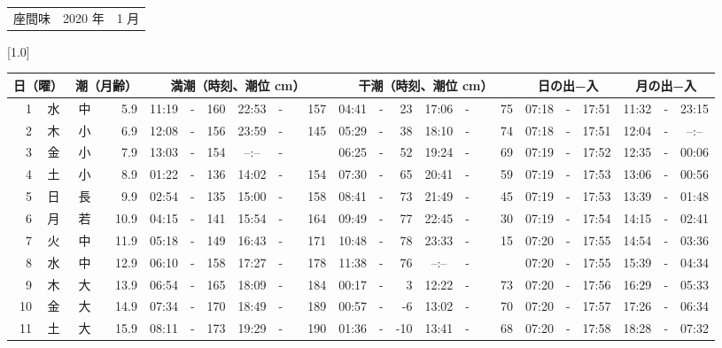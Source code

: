 \documentclass[12pt,a4j]{jsarticle}
\begin{document}
 \begin{table}[htbp]
 \begin{center}
 \begin{tabular}{lcc}
 \LARGE{座間味}  & \large{2020 年} & \large{ 1 月} \\
 \end{tabular}
 \end{center}
 \begin{center}
    \scalebox{0.7}[1.0]{
    \begin{tabular}{|rc|cr|ccrccr|ccrccr|ccc|ccc|}
    \hline
    \multicolumn{2}{|c|}{日（曜）} & \multicolumn{2}{c|}{潮（月齢）} & \multicolumn{6}{c|}{満潮（時刻、潮位 cm）} & \multicolumn{6}{c|}{干潮（時刻、潮位 cm）} & \multicolumn{3}{c|}{日の出−入} &  \multicolumn{3}{c|}{月の出−入}\\
 \hline
 1 & 水 & 中 &  5.9 &  11:19 &-& 160 &  22:53 &-& 157 &  04:41 &-&  23 &  17:06 &-&  75 & 07:18 & -& 17:51 & 11:32 & -& 23:15 \\
 2 & 木 & 小 &  6.9 &  12:08 &-& 156 &  23:59 &-& 145 &  05:29 &-&  38 &  18:10 &-&  74 & 07:18 & -& 17:51 & 12:04 & -& --:-- \\
 3 & 金 & 小 &  7.9 &  13:03 &-& 154 &  --:-- &-&~~~~~ &  06:25 &-&  52 &  19:24 &-&  69 & 07:19 & -& 17:52 & 12:35 & -& 00:06 \\
 4 & 土 & 小 &  8.9 &  01:22 &-& 136 &  14:02 &-& 154 &  07:30 &-&  65 &  20:41 &-&  59 & 07:19 & -& 17:53 & 13:06 & -& 00:56 \\
 5 & 日 & 長 &  9.9 &  02:54 &-& 135 &  15:00 &-& 158 &  08:41 &-&  73 &  21:49 &-&  45 & 07:19 & -& 17:53 & 13:39 & -& 01:48 \\
 6 & 月 & 若 & 10.9 &  04:15 &-& 141 &  15:54 &-& 164 &  09:49 &-&  77 &  22:45 &-&  30 & 07:19 & -& 17:54 & 14:15 & -& 02:41 \\
 7 & 火 & 中 & 11.9 &  05:18 &-& 149 &  16:43 &-& 171 &  10:48 &-&  78 &  23:33 &-&  15 & 07:20 & -& 17:55 & 14:54 & -& 03:36 \\
 8 & 水 & 中 & 12.9 &  06:10 &-& 158 &  17:27 &-& 178 &  11:38 &-&  76 &  --:-- &-&~~~~~ & 07:20 & -& 17:55 & 15:39 & -& 04:34 \\
 9 & 木 & 大 & 13.9 &  06:54 &-& 165 &  18:09 &-& 184 &  00:17 &-&   3 &  12:22 &-&  73 & 07:20 & -& 17:56 & 16:29 & -& 05:33 \\
10 & 金 & 大 & 14.9 &  07:34 &-& 170 &  18:49 &-& 189 &  00:57 &-&  -6 &  13:02 &-&  70 & 07:20 & -& 17:57 & 17:26 & -& 06:34 \\
11 & 土 & 大 & 15.9 &  08:11 &-& 173 &  19:29 &-& 190 &  01:36 &-& -10 &  13:41 &-&  68 & 07:20 & -& 17:58 & 18:28 & -& 07:32 \\

\end{tabular}}
\end{center}
\end{table}
\end{document}
